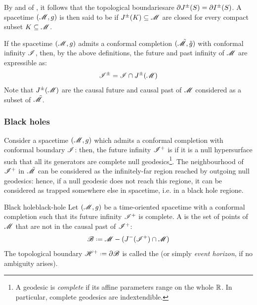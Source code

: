 By  and  of , it follows that the topological boundaries\footnotemark are $ \partial J^\pm(S) = \partial I^\pm(S) $. A spacetime $ (\mathscr{M} , g) $ is then said to be  if $ J^\pm(K) \subseteq \mathscr{M} $ are closed for every compact subset $ K \subseteq \mathscr{M} $.


If the spacetime $ (\mathscr{M} , g) $ admits a conformal completion $ (\tilde{\mathscr{M}} , \tilde{g}) $ with conformal infinity $ \mathscr{I} $, then, by the above definitions, the future and past infinity of $ \mathscr{M} $ are expressible as:
\begin{equation}
  \mathscr{I}^\pm = \mathscr{I} \cap J^\pm(\mathscr{M})
\end{equation}
Note that $ J^\pm(\mathscr{M}) $ are the causal future and causal past of $ \mathscr{M} $ considered as a subset of $ \tilde{\mathscr{M}} $.

\subsubsection{Black holes}

Consider a spacetime $ (\mathscr{M} , g) $ which admits a conformal completion with conformal boundary $ \mathscr{I} $: then, the future infinity $ \mathscr{I}^+ $ is  if it is a null hypersurface such that all its generators are complete null geodesics\footnote{A geodesic is \emph{complete} if its affine parameters range on the whole $ \mathbb{R} $. In particular, complete geodesics are indextendible.}. The neighbourhood of $ \mathscr{I}^+ $ in $ \tilde{\mathscr{M}} $ can be considered as the infinitely-far region reached by outgoing null geodesics: hence, if a null geodesic does not reach this regione, it can be considered as trapped somewhere else in spacetime, i.e. in a black hole regione.

\begin{definition}{Black hole}{black-hole}
  Let $ (\mathscr{M} , g) $ be a time-oriented spacetime with a conformal completion such that its future infinity $ \mathscr{I}^+ $ is complete. A  is the set of points of $ \mathscr{M} $ that are not in the causal past of $ \mathscr{I}^+ $:
  \begin{equation}
    \bh \defeq \man - (J^-(\scri^+) \cap \man)
    \label{eq:bh-def}
  \end{equation}
  The topological boundary $ \eh^+ \defeq \pa \bh $ is called the  (or simply \emph{event horizon}, if no ambiguity arises).
\end{definition}

